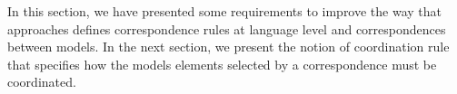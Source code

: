 


	

In this section, we have presented some requirements to improve the way that approaches defines correspondence rules at language level and correspondences between models. %
In the next section, we present the notion of coordination rule that specifies how the models elements selected by a correspondence must be coordinated.     
	
	
					



